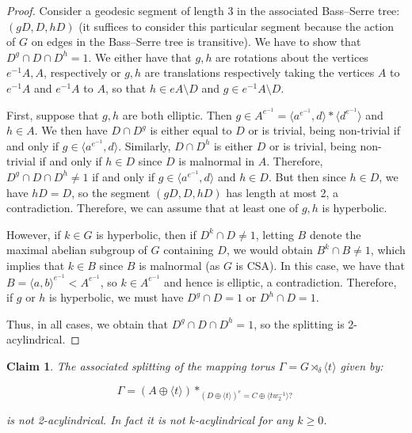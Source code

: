 \documentclass{amsart}
\theoremstyle{plain}
\newtheorem{claim}[thm]{Claim}
\theoremstyle{definition}
\theoremstyle{remark}
\begin{document}
\begin{proof}
    Consider a geodesic segment of length 3 in the associated Bass--Serre tree: $(gD, D, hD)$ (it suffices to consider this particular segment because the action of $G$ on edges in the Bass--Serre tree is transitive). We have to show that $D^g \cap D \cap D^h = 1$. We either have that $g,h$ are rotations about the vertices $e^{-1}A, A$, respectively or $g,h$ are translations respectively taking the vertices $A$ to $e^{-1}A$ and $e^{-1}A$ to $A$, so that $h \in eA \setminus D$ and $g \in e^{-1}A \setminus D$. 

    First, suppose that $g,h$ are both elliptic. Then $g \in A^{e^{-1}} = \langle a^{e^{-1}}, d \rangle * \langle d^{e^{-1}} \rangle$ and $h \in A$. We then have $D \cap D^g$ is either equal to $D$ or is trivial, being non-trivial if and only if $g \in \langle a^{e^{-1}}, d \rangle$. Similarly, $D \cap D^h$ is either $D$ or is trivial, being non-trivial if and only if $h \in D$ since $D$ is malnormal in $A$. Therefore, $D^g \cap D \cap D^h \neq 1$ if and only if $g \in \langle a^{e^{-1}}, d \rangle$ and $h \in D$. But then since $h \in D$, we have $hD = D$, so the segment $(gD, D, hD)$ has length at most 2, a contradiction. Therefore, we can assume that at least one of $g,h$ is hyperbolic. 

    However, if $k \in G$ is hyperbolic, then if $D^k \cap D \neq 1$, letting $B$ denote the maximal abelian subgroup of $G$ containing $D$, we would obtain $B^k \cap B \neq 1$, which implies that $k \in B$ since $B$ is malnormal (as $G$ is CSA). In this case, we have that $B = \langle a,b \rangle^{e^{-1}} < A^{e^{-1}}$, so $k \in A^{e^{-1}}$ and hence is elliptic, a contradiction. Therefore, if $g$ or $h$ is hyperbolic, we must have $D^g \cap D = 1$ or $D^h \cap D = 1$. 

    Thus, in all cases, we obtain that $D^g \cap D \cap D^h = 1$, so the splitting is 2-acylindrical.
    
\end{proof}

\begin{claim}
    \label{claim: non-acylindrical mapping torus}
    The associated splitting of the mapping torus $\Gamma = G \rtimes_{\delta} \langle t \rangle$ given by: 

    $$\Gamma = (A \oplus \langle t \rangle)*_{(D \oplus \langle t \rangle)^e = C \oplus \langle tw_2^{-1} \rangle?}$$

    is not 2-acylindrical. In fact it is not $k$-acylindrical for any $k \geq 0$.
\end{claim}
\end{document}
